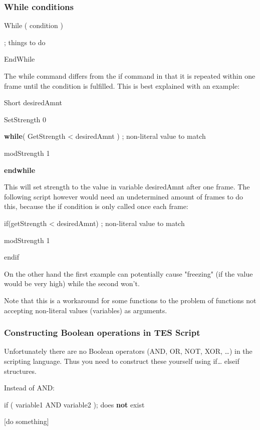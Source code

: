 \documentclass[
]{article}
\begin{document}
\hypertarget{while-conditions}{%
\subsubsection{While conditions}\label{while-conditions}}

While ( condition )

; things to do

EndWhile

The while command differs from the if command in that it is repeated
within one frame until the condition is fulfilled. This is best
explained with an example:

Short desiredAmnt

SetStrength 0

\textbf{while}( GetStrength \textless{} desiredAmnt ) ; non-literal
value to match

modStrength 1

\textbf{endwhile}

This will set strength to the value in variable desiredAmnt after one
frame. The following script however would need an undetermined amount of
frames to do this, because the if condition is only called once each
frame:

if(getStrength \textless{} desiredAmnt) ; non-literal value to match

modStrength 1

endif

On the other hand the first example can potentially cause "freezing" (if
the value would be very high) while the second won't.

Note that this is a workaround for some functions to the problem of
functions not accepting non-literal values (variables) as arguments.

\hypertarget{constructing-boolean-operations-in-tes-script}{%
\subsubsection{Constructing Boolean operations in TES
Script}\label{constructing-boolean-operations-in-tes-script}}

Unfortunately there are no Boolean operators (AND, OR, NOT, XOR, \ldots)
in the scripting language. Thus you need to construct these yourself
using if\ldots{} elseif structures.

Instead of AND:

if ( variable1 AND variable2 ); does \textbf{not} exist

{[}do something{]}
\end{document}
